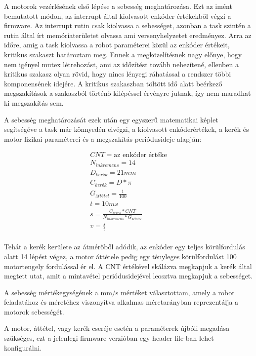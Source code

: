 \medskip

A motorok vezérlésének első lépése a sebesség meghatározása. Ezt az imént
bemutatott módon, az interrupt által kiolvasott enkóder értékekből végzi a
firmware. Az interrupt rutin csak kiolvassa a sebességet, azonban a task szintén
a rutin által írt memóriaterületet olvassa ami versenyhelyzetet eredményez. Arra
az időre, amig a task kiolvassa a robot paraméterei közül az enkóder értékeit,
kritikus szakaszt határoztam meg. Ennek a megközelítésnek nagy előnye, hogy nem
igényel mutex létrehozást, ami az időzítést tovább nehezítené, ellenben a
kritikus szakasz olyan rövid, hogy nincs lényegi ráhatással a rendszer többi
komponensének idejére. A kritikus szakaszban töltött idő alatt beérkező
megszakítások a szakaszból történő kilépéssel érvényre jutnak, így nem 
maradhat ki megszakítás sem.

A sebesség meghatározását ezek után egy egyszerű matematikai képlet segítségéve a
task már könnyedén elvégzi, a kiolvasott enkóderértékek, a kerék és motor fizikai
paraméterei és a megszakítás periódusideje alapján:

\begin{eqnarray*}
CNT = \text{az enkóder értéke} \\
N_{inkremens} = 14 \\
D_{kerék} = 21 mm \\
C_{kerék} = D * \pi \\
G_{áttétel} = \frac{1}{100} \\
t = 10 ms \\
s = \frac{C_{kerék} * CNT}{N_{inkremens} * G_{áttétel}} \\
v = \frac{s}{t} \\
\end{eqnarray*}

Tehát a kerék kerülete az átmérőből adódik, az enkóder egy teljes körülfordulás
alatt 14 lépést végez, a motor áttétele pedig egy tényleges körülfordulást 100
motortengely fordulással ér el. A CNT értékével skálázva megkapjuk a kerék által
megtett utat, amit a mintavétel periódusidejével leosztva megkapjuk a
sebességet.

A sebesség mértékegységének a mm/s mértéket választottam, amely a robot
feladatához  és méretéhez viszonyítva alkalmas méretarányban reprezentálja a
motorok sebességét.

A motor, áttétel, vagy kerék cseréje esetén a paraméterek újbóli megadása
szükséges, ezt a jelenlegi firmware verzióban egy header file-ban lehet
konfigurálni. 


